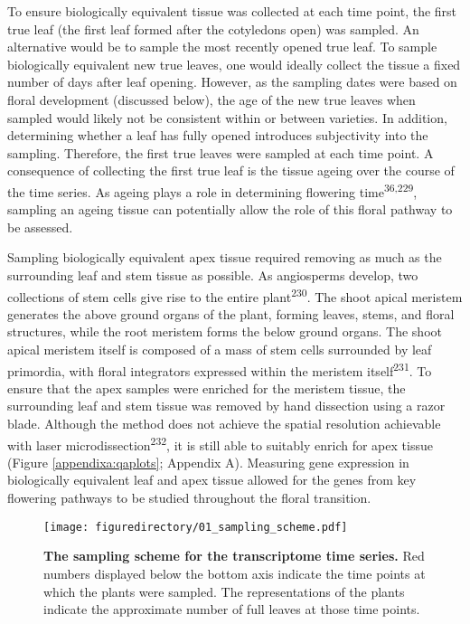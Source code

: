 \documentclass[12pt,]{book}
\begin{document}
To ensure biologically equivalent tissue was collected at each time
point, the first true leaf (the first leaf formed after the cotyledons
open) was sampled. An alternative would be to sample the most recently
opened true leaf. To sample biologically equivalent new true leaves, one
would ideally collect the tissue a fixed number of days after leaf
opening. However, as the sampling dates were based on floral development
(discussed below), the age of the new true leaves when sampled would
likely not be consistent within or between varieties. In addition,
determining whether a leaf has fully opened introduces subjectivity into
the sampling. Therefore, the first true leaves were sampled at each time
point. A consequence of collecting the first true leaf is the tissue
ageing over the course of the time series. As ageing plays a role in
determining flowering time\textsuperscript{36,229}, sampling an ageing
tissue can potentially allow the role of this floral pathway to be
assessed.

Sampling biologically equivalent apex tissue required removing as much
as the surrounding leaf and stem tissue as possible. As angiosperms
develop, two collections of stem cells give rise to the entire
plant\textsuperscript{230}. The shoot apical meristem generates the
above ground organs of the plant, forming leaves, stems, and floral
structures, while the root meristem forms the below ground organs. The
shoot apical meristem itself is composed of a mass of stem cells
surrounded by leaf primordia, with floral integrators expressed within
the meristem itself\textsuperscript{231}. To ensure that the apex
samples were enriched for the meristem tissue, the surrounding leaf and
stem tissue was removed by hand dissection using a razor blade. Although
the method does not achieve the spatial resolution achievable with laser
microdissection\textsuperscript{232}, it is still able to suitably
enrich for apex tissue (Figure \ref{appendixa:qaplots}; Appendix A).
Measuring gene expression in biologically equivalent leaf and apex
tissue allowed for the genes from key flowering pathways to be studied
throughout the floral transition.

\begin{figure}[htbp]
\centering
\texttt{[image: figuredirectory/01\_sampling\_scheme.pdf]}
\caption{\textbf{The sampling scheme for the transcriptome time series.}
Red numbers displayed below the bottom axis indicate the time points at
which the plants were sampled. The representations of the plants
indicate the approximate number of full leaves at those time
points.}\label{figure:201:samplingscheme}
\end{figure}
\end{document}
